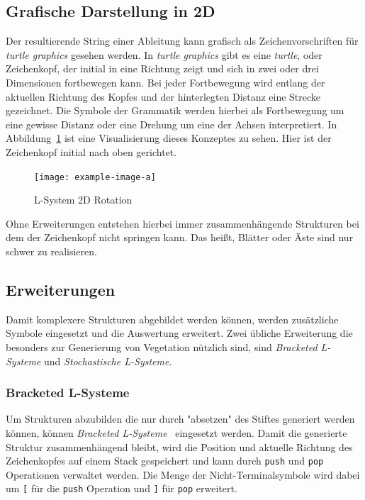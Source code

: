 \subsection{Grafische Darstellung in 2D}
Der resultierende String einer Ableitung kann grafisch als Zeichenvorschriften für \emph{turtle graphics} gesehen werden. %
In \emph{turtle graphics} gibt es eine \emph{turtle}, oder Zeichenkopf, der initial in eine Richtung zeigt und sich in zwei oder drei Dimensionen fortbewegen kann. %
Bei jeder Fortbewegung wird entlang der aktuellen Richtung des Kopfes und der hinterlegten Distanz eine Strecke gezeichnet.
Die Symbole der Grammatik werden hierbei als Fortbewegung um eine gewisse Distanz oder eine Drehung um eine der Achsen interpretiert.
In Abbildung~\ref{fig:L-System 2D Rotation} ist eine Visualisierung dieses Konzeptes zu sehen.
Hier ist der Zeichenkopf initial nach oben gerichtet.
\begin{figure}[ht]
    \centering
        
    \texttt{[image: example-image-a]}
    \caption{L-System 2D Rotation}\label{fig:L-System 2D Rotation}
\end{figure}

Ohne Erweiterungen entstehen hierbei immer zusammenhängende Strukturen bei dem der Zeichenkopf nicht springen kann.
Das heißt, Blätter oder Äste sind nur schwer zu realisieren.


\subsection{Erweiterungen}
Damit komplexere Strukturen abgebildet werden können, werden zusätzliche Symbole eingesetzt und die Auswertung erweitert.
Zwei übliche Erweiterung die besonders zur Generierung von Vegetation nützlich sind, sind \emph{Bracketed L-Systeme} und \emph{Stochastische L-Systeme}.

\subsubsection{Bracketed L-Systeme}
Um Strukturen abzubilden die nur durch "absetzen" des Stiftes generiert werden können, können \emph{Bracketed L-Systeme}~\cite*{Shaker2016} eingesetzt werden.
Damit die generierte Struktur zusammenhängend bleibt, wird die Position und aktuelle Richtung des Zeichenkopfes auf einem Stack gespeichert und kann durch \texttt{push} und \texttt{pop} Operationen verwaltet werden.
Die Menge der Nicht-Terminalsymbole wird dabei um \texttt{[} für die \texttt{push} Operation und \texttt{]} für \texttt{pop} erweitert.

